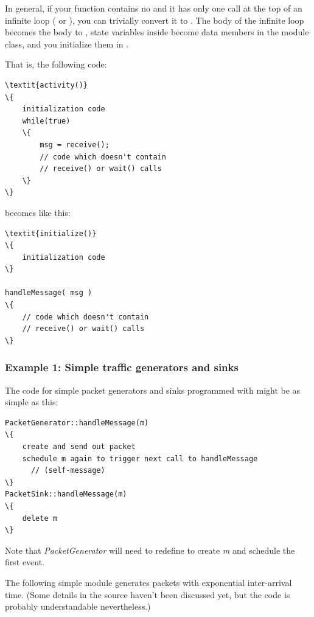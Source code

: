In general, if your  function contains no
 and it has only one  call
at the top of an infinite loop ( or ),
you can trivially convert it to .
The body of the infinite loop becomes the body to ,
state variables inside  become data members in
the module class, and you initialize them in .

That is, the following code:

\begin{Verbatim}[commandchars=\\\{\}]
\textit{activity()}
\{
    initialization code
    while(true)
    \{
        msg = receive();
        // code which doesn't contain
        // receive() or wait() calls
    \}
\}
\end{Verbatim}

becomes like this:

\begin{Verbatim}[commandchars=\\\{\}]
\textit{initialize()}
\{
    initialization code
\}

handleMessage( msg )
\{
    // code which doesn't contain
    // receive() or wait() calls
\}
\end{Verbatim}



\subsubsection{Example 1: Simple traffic generators and sinks}


The code for simple packet generators and sinks programmed with  might
be as simple as this:

\begin{Verbatim}[commandchars=\\\{\}]
PacketGenerator::handleMessage(m)
\{
    create and send out packet
    schedule m again to trigger next call to handleMessage
      // (self-message)
\}
PacketSink::handleMessage(m)
\{
    delete m
\}
\end{Verbatim}



Note that \textit{PacketGenerator} will need to redefine 
to create \textit{m} and schedule the first event.

The following simple module generates packets with exponential
inter-arrival time. (Some details in the source haven't been
discussed yet, but the code is probably understandable nevertheless.)


